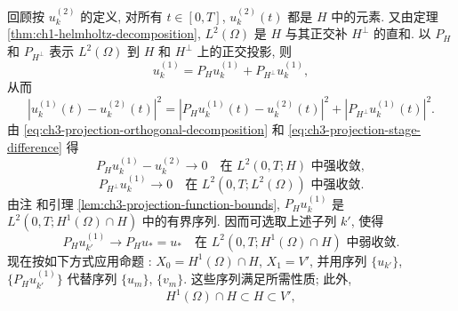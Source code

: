 回顾按 $u_k^{(2)}$ 的定义, 对所有 $t\in[0,T]$, $u_k^{(2)}(t)$ 都是 $H$ 中的元素. 又由定理 \ref{thm:ch1-helmholtz-decomposition}, $L^2(\Omega)$ 是 $H$ 与其正交补 $H^\perp$ 的直和. 以 $P_H$ 和 $P_{H^\perp}$ 表示 $L^2(\Omega)$ 到 $H$ 和 $H^\perp$ 上的正交投影, 则
\[
u_k^{(1)}=P_Hu_k^{(1)}+P_{H^\perp}u_k^{(1)},
\]
从而
\begin{equation}
|u_k^{(1)}(t)-u_k^{(2)}(t)|^2
=|P_Hu_k^{(1)}(t)-u_k^{(2)}(t)|^2
+|P_{H^\perp}u_k^{(1)}(t)|^2.
\label{eq:ch3-projection-orthogonal-decomposition}
\end{equation}
由 \eqref{eq:ch3-projection-orthogonal-decomposition} 和 \eqref{eq:ch3-projection-stage-difference} 得
\begin{equation}
P_Hu_k^{(1)}-u_k^{(2)}\longrightarrow0
\quad\text{在 }L^2(0,T;H)\text{ 中强收敛},
\label{eq:ch3-projection-ph-difference}
\end{equation}
\begin{equation}
P_{H^\perp}u_k^{(1)}\longrightarrow0
\quad\text{在 }L^2(0,T;L^2(\Omega))\text{ 中强收敛}.
\label{eq:ch3-projection-phperp-difference}
\end{equation}
由注  和引理 \ref{lem:ch3-projection-function-bounds}, $P_Hu_k^{(1)}$ 是 $L^2(0,T;H^1(\Omega)\cap H)$ 中的有界序列. 因而可选取上述子列 $k'$, 使得
\begin{equation}
P_Hu_{k'}^{(1)}\longrightarrow P_Hu_*=u_*
\quad\text{在 }L^2(0,T;H^1(\Omega)\cap H)\text{ 中弱收敛}.
\label{eq:ch3-projection-ph-weak}
\end{equation}
现在按如下方式应用命题 : $X_0=H^1(\Omega)\cap H$, $X_1=V'$, 并用序列 $\{u_{k'}\}$, $\{P_Hu_{k'}^{(1)}\}$ 代替序列 $\{u_m\}$, $\{v_m\}$. 这些序列满足所需性质; 此外,
\[
H^1(\Omega)\cap H\subset H\subset V',
\]

